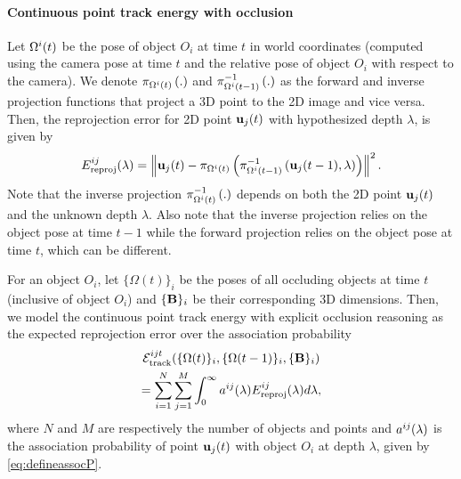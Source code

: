 \vspace{-0.3cm}
\paragraph{Continuous point track energy with occlusion}
Let $\Omega^{i}(t)$ be the pose of object $O_i$ at time $t$ in world coordinates (computed using the camera pose at time $t$ and the relative pose of object $O_i$ with respect to the camera). We denote $\pi_{\Omega^{i}(t)}\left(.\right)$ and $\pi^{-1}_{\Omega^{i}(t-1)}\left(.\right)$ as the forward and inverse projection functions that project a 3D point to the 2D image and vice versa. Then, the reprojection error for 2D point $\mathbf{u}_j(t)$ with hypothesized depth $\lambda$, is given by
\begin{equation}
E^{ij}_{\text{reproj}}(\lambda) = \left\|\mathbf{u}_j(t) - \pi_{\Omega^{i}(t)}\left(\pi^{-1}_{\Omega^{i}(t-1)}\left(\mathbf{u}_j(t-1), \lambda\right)\right)\right\|^2.
\label{eq:reprojerror}
\end{equation}
Note that the inverse projection $\pi^{-1}_{\Omega^{i}(t)}\left(.\right)$ depends on both the 2D point $\mathbf{u}_j(t)$ and the unknown depth $\lambda$. Also note that the inverse projection relies on the object pose at time $t-1$ while the forward projection relies on the object pose at time $t$, which can be different.

For an object $O_i$, let $\{ \Omega (t) \}_i$ be the poses of all occluding objects at time $t$ (inclusive of object $O_i$) and $ \{ \mathbf{B} \}_i$ be their corresponding 3D dimensions. Then, we model the continuous point track energy with explicit occlusion reasoning as the expected reprojection error over the association probability
\begin{multline}
  \mathcal{E}^{ijt}_{\text{track}}(\{ \Omega (t) \}_i, \{ \Omega (t-1) \}_i, \{ \mathbf{B} \}_i )
  \\
    = \sum_{i=1}^{N} 
    \sum_{j = 1}^{M}
    \int_0^\infty a^{ij}(\lambda)E^{ij}_{\text{reproj}}(\lambda) d\lambda,
\end{multline}
where $N$ and $M$ are respectively the number of objects and points and $a^{ij}(\lambda)$ is the association probability of point $\mathbf{u}_j(t)$ with object $O_i$ at depth $\lambda$, given by \eqref{eq:defineassocP}.


